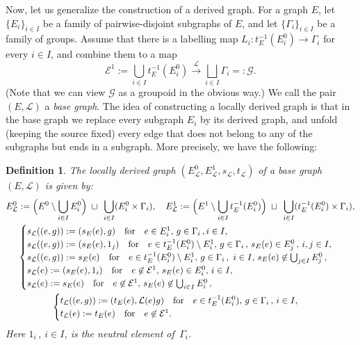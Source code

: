 \documentclass[12pt,times,a4paper]{amsart}
\newtheorem{definition}[theorem]{Definition}
\numberwithin{equation}{section}
\def\text{\hbox}
\numberwithin{equation}{section}
\begin{document}


Now, let us generalize the construction of a derived graph. For a graph $E$, let $\{E_i\}_{i\in I}$ be a family of 
pairwise-disjoint subgraphs of $E$,
 and let $\{\Gamma_i\}_{i\in I}$ be a family of groups. Assume that there is a labelling map 
$L_i:t_E^{-1}(E^0_i)\to\Gamma_i$ for every $i\in I$,
  and combine them to a map 
  \begin{equation}
 \mathcal{E}^1:=\bigcup_{i\in I}t_E^{-1}(E^0_i)\stackrel{ \mathcal{L}}{\longrightarrow} \bigsqcup_{i\in I}\Gamma_i=:
\mathcal{G}.
  \end{equation} 
(Note that we can view $\mathcal{G}$ as a groupoid in the obvious way.)
  We call the pair $(E,\mathcal{L})$ a {\em base graph}. The idea of constructing 
a locally derived graph is that in the base graph we replace 
  every subgraph $E_i$ by its derived graph, and unfold (keeping the source fixed) 
every edge that does not belong to any of the subgraphs but
ends in a subgraph. More precisely, we have the following:
 \begin{definition}
 The {\em locally derived graph} $(E_\mathcal{L}^0,E^1_\mathcal{L},s_\mathcal{L},t_\mathcal{L})$ of a base graph $(E,
\mathcal{L})$ is given by:
 \begin{gather}
 E_\mathcal{L}^0:= \Big(E^0\setminus  \bigcup_{i\in I} E^0_i\Big)\; \sqcup\, \;\bigcup_{i\in I} (E^0_i\times\Gamma_i),\quad
E_\mathcal{L}^1:= \Big(E^1\setminus  \bigcup_{i\in I} t_E^{-1}(E^0_i)\Big)\; \sqcup\, \;\bigcup_{i\in I} 
(t_E^{-1}(E^0_i)\times\Gamma_i),
\nonumber \\
  \begin{cases}
 s_\mathcal{L}((e,g)):=
 (s_E(e),g)\quad\text{for}\quad e\in E^1_i,\,g\in\Gamma_i\,,i\in I,
 \\
s_\mathcal{L}((e,g)):=
 (s_E(e),1_j)\quad\text{for}\quad e\in  t_E^{-1}(E^0_i)\setminus E^1_i,\,g\in\Gamma_i\,,\, s_E(e)\in E^0_j\,,\,i,j\in I,
 \\
s_\mathcal{L}((e,g)):=
 s_E(e)\quad\text{for}\quad e\in  t_E^{-1}(E^0_i)\setminus E^1_i,\,g\in\Gamma_i\,,\, \,i\in I,\,
s_E(e)\not\in \bigcup_{j\in I}E^0_j\,,
 \\
  s_\mathcal{L}(e):=(s_E(e),1_i)\quad\text{for}\quad e\not\in\mathcal{E}^1,\, s_E(e)\in E^0_i,\, i\in I,
  \\
  s_\mathcal{L}(e):=s_E(e)\quad\text{for}\quad e\not\in\mathcal{E}^1,\, s_E(e)\not\in \bigcup_{i\in I}E^0_i\, ,
 \end{cases} \nonumber\\
 \begin{cases}
 t_\mathcal{L}((e,g)):=
 (t_E(e),\mathcal{L}(e)g)\quad\text{for}\quad e\in t^{-1}_E(E^0_i),\,g\in\Gamma_i\,,\, i\in I,
 \\
  t_\mathcal{L}(e):=t_E(e)\quad\text{for}\quad e\not\in\mathcal{E}^1.
 \end{cases} \label{targetL}
 \end{gather}
 Here $1_i$\,, $i\in I$, is the neutral element of $\,\Gamma_i$.
 \end{definition}
 
\end{document}
